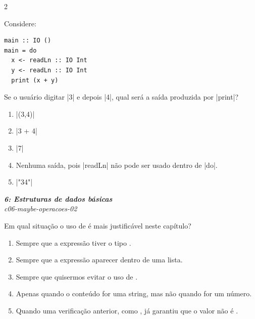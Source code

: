 \documentclass[a4paper,10pt,brazil]{article}
\begin{document}
\begin{multicols}{2}
\begin{flushright}
\end{flushright}
Considere:

\begin{verbatim}
main :: IO ()
main = do
  x <- readLn :: IO Int
  y <- readLn :: IO Int
  print (x + y)
\end{verbatim}

Se o usuário digitar \haskellinline|3| e depois \haskellinline|4|, qual será a saída produzida por \haskellinline|print|?

\begin{enumerate}
  \item \haskellinline|(3,4)|

  \item \haskellinline|3 + 4|

  \item \haskellinline|7|

  \item Nenhuma saída, pois \haskellinline|readLn| não pode ser usado dentro de \haskellinline|do|.

  \item \haskellinline|"34"|


\end{enumerate}

\begin{flushright}
  \footnotesize
  \textit{\textbf{6: Estruturas de dados básicas}}\\
  \textit{c06-maybe-operacoes-02}\\

\end{flushright}
Em qual situação o uso de  é mais justificável neste capítulo?

\begin{enumerate}
  \item Sempre que a expressão tiver o tipo .

  \item Sempre que a expressão aparecer dentro de uma lista.

  \item Sempre que quisermos evitar o uso de .

  \item Apenas quando o conteúdo for uma string, mas não quando for um número.

  \item Quando uma verificação anterior, como , já garantiu que o valor não é .



\end{enumerate}
\end{multicols}
\end{document}
